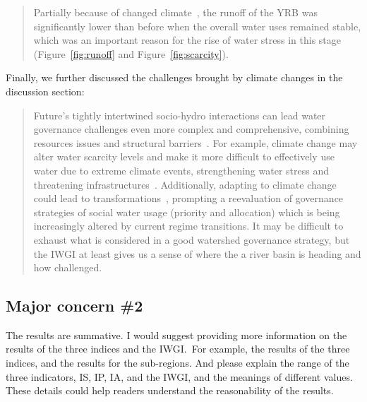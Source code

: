 \begin{quote}
	Partially because of changed climate~\cite{han2023,liu2020c}, the runoff of the YRB was significantly lower than before when the overall water uses remained stable, which was an important reason for the rise of water stress in this stage (Figure~\ref{fig:runoff} and Figure~\ref{fig:scarcity}).
\end{quote}

\AR*{} Finally, we further discussed the challenges brought by climate changes in the discussion section:

\begin{quote}
	Future's tightly intertwined socio-hydro interactions can lead water governance challenges even more complex and comprehensive, combining resources issues and structural barriers~\cite{huggins2022a}.
	For example, climate change may alter water scarcity levels and make it more difficult to effectively use water due to extreme climate events, strengthening water stress and threatening infrastructures~\cite{liu2017, dibaldassarre2019}.
	Additionally, adapting to climate change could lead to transformations~\cite{sachs2019,barnes2020}, prompting a reevaluation of governance strategies of social water usage (priority and allocation) which is being increasingly altered by current regime transitions.
	It may be difficult to exhaust what is considered in a good watershed governance strategy, but the IWGI at least gives us a sense of where the a river basin is heading and how challenged.
\end{quote}

\subsection{Major concern \#2}
\RC{} The results are summative. I would suggest providing more information on the results of the three indices and the IWGI.\ For example, the results of the three indices, and the results for the sub-regions. And please explain the range of the three indicators, IS, IP, IA, and the IWGI, and the meanings of different values. These details could help readers understand the reasonability of the results.

